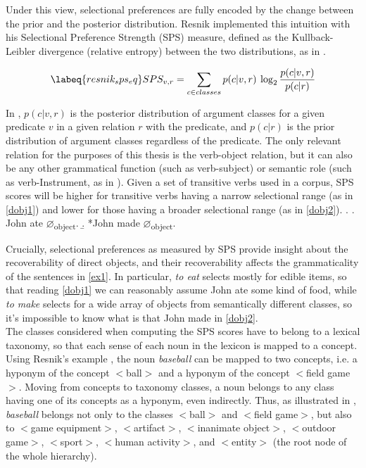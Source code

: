 Under this view, selectional preferences are fully encoded by the change between the prior and the posterior distribution. Resnik implemented this intuition with his Selectional Preference Strength (SPS) measure, defined as the Kullback-Leibler divergence (relative entropy) between the two distributions, as in .

\begin{equation} \labeq{resnik_sps_eq}
SPS_{v,r} = \sum_{c \in classes} p(c|v,r) \: \log_{2}\frac{p(c|v,r)}{p(c|r)}
\end{equation}

In , $p(c|v,r)$ is the posterior distribution of argument classes for a given predicate $v$ in a given relation $r$ with the predicate, and $p(c|r)$ is the prior distribution of argument classes regardless of the predicate. The only relevant relation for the purposes of this thesis is the verb-object relation, but it can also be any other grammatical function (such as verb-subject) or semantic role (such as verb-Instrument, as in \textcite{CappelliLenciPISA}). Given a set of transitive verbs used in a corpus, SPS scores will be higher for transitive verbs having a narrow selectional range (as in \ref{dobj1}) and lower for those having a broader selectional range (as in \ref{dobj2}).
\ex.\label{ex1} \a. \label{dobj1} John ate $\varnothing$\textsubscript{object}.
\b. \label{dobj2} *John made $\varnothing$\textsubscript{object}.

Crucially, selectional preferences as measured by SPS provide insight about the recoverability of direct objects, and their recoverability affects the grammaticality of the sentences in \ref{ex1}. In particular, \textit{to eat} selects mostly for edible items, so that reading \ref{dobj1} we can reasonably assume John ate some kind of food, while \textit{to make} selects for a wide array of objects from semantically different classes, so it's impossible to know what is that John made in \ref{dobj2}.\\
The classes considered when computing the SPS scores have to belong to a lexical taxonomy, so that each sense of each noun in the lexicon is mapped to a concept. Using Resnik's example \parencite[59]{Resnik1993}, the noun \textit{baseball} can be mapped to two concepts, i.e. a hyponym of the concept $<$ball$>$ and a hyponym of the concept $<$field game$>$. Moving from concepts to taxonomy classes, a noun belongs to any class having one of its concepts as a hyponym, even indirectly. Thus, as illustrated in , \textit{baseball} belongs not only to the classes $<$ball$>$ and $<$field game$>$, but also to $<$game equipment$>$, $<$artifact$>$, $<$inanimate object$>$, $<$outdoor game$>$, $<$sport$>$, $<$human activity$>$, and $<$entity$>$ (the root node of the whole hierarchy).

